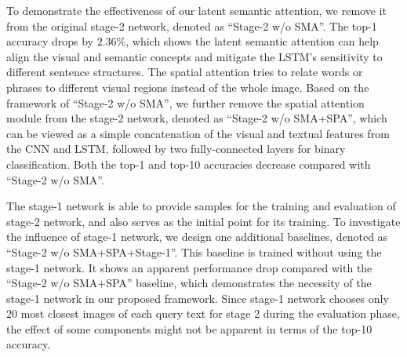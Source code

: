 To demonstrate the effectiveness of our latent semantic attention, we remove it from the original stage-2 network, denoted as ``Stage-2 w/o SMA''. The top-1 accuracy drops by $2.36\%$, which shows the latent semantic attention can help align the visual and semantic concepts and mitigate the LSTM's sensitivity to different sentence structures.
The spatial attention tries to relate words or phrases to different visual regions instead of the whole image. Based on the framework of ``Stage-2 w/o SMA'', we further remove the spatial attention module from the stage-2 network, denoted as ``Stage-2 w/o SMA+SPA'', which can be viewed as a simple concatenation of the visual and textual features from the CNN and LSTM, followed by two fully-connected layers for binary classification. Both the top-1 and top-10 accuracies decrease compared with ``Stage-2 w/o SMA''.

The stage-1 network is able to provide samples for the training and evaluation of stage-2 network, and also serves as the initial point for its training. To investigate the influence of stage-1 network, we design one additional baselines, denoted as ``Stage-2 w/o SMA+SPA+Stage-1''. This baseline is trained without using the stage-1 network. It shows an apparent performance drop compared with the ``Stage-2 w/o SMA+SPA'' baseline, which  demonstrates the necessity of the stage-1 network in our proposed framework.
Since stage-1 network chooses only $20$ most closest images of each query text for stage 2 during the evaluation phase, the effect of some components might not be apparent in terms of the top-10 accuracy.


